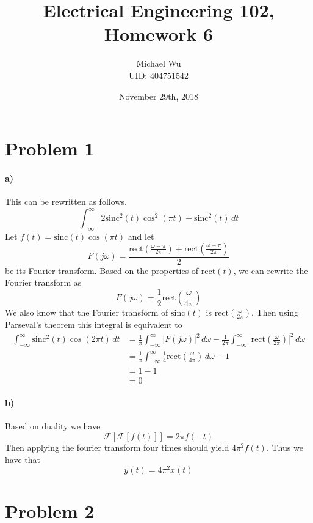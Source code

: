 \documentclass[12pt]{article}
\begin{document}
\title{Electrical Engineering 102, Homework 6}
\date{November 29th, 2018}
\author{Michael Wu\\UID: 404751542}
\maketitle

\section*{Problem 1}

\paragraph{a)}

This can be rewritten as follows.
\[\int_{-\infty}^\infty 2\text{sinc}^2(t)\cos^2(\pi t) - \text{sinc}^2(t)\, dt\]
Let \(f(t)=\text{sinc}(t)\cos(\pi t)\) and let
\[F(j\omega)=\frac{\text{rect}\left(\frac{\omega-\pi}{2\pi}\right)+\text{rect}\left(\frac{\omega+\pi}{2\pi}\right)}{2}\]
be its Fourier transform. Based on the properties of \(\text{rect}(t)\), we can rewrite the Fourier transform as
\[F(j\omega)=\frac{1}{2}\text{rect}\left(\frac{\omega}{4\pi}\right)\]
We also know that the Fourier transform of \(\text{sinc}(t)\) is \(\text{rect}\left(\frac{\omega}{2\pi}\right)\).
Then using Parseval's theorem this integral is equivalent to
\begin{align*}
    \int_{-\infty}^\infty \text{sinc}^2(t)\cos(2\pi t)\, dt
    &=\frac{1}{\pi}\int_{-\infty}^{\infty} |F(j\omega)|^2\,d\omega - \frac{1}{2\pi} \int_{-\infty}^\infty \left|\text{rect}\left(\frac{\omega}{2\pi}\right)\right|^2\,d\omega\\
    &=\frac{1}{\pi}\int_{-\infty}^{\infty}\frac{1}{4}\text{rect}\left(\frac{\omega}{4\pi}\right)\,d\omega - 1\\
    &=1-1\\
    &=0
\end{align*}

\paragraph{b)}

Based on duality we have
\[\mathcal{F}[\mathcal{F}[f(t)]]=2\pi f(-t)\]
Then applying the fourier transform four times should yield \(4\pi^2 f(t)\). Thus we have that
\[y(t)=4\pi^2x(t)\]

\section*{Problem 2}
\end{document}
